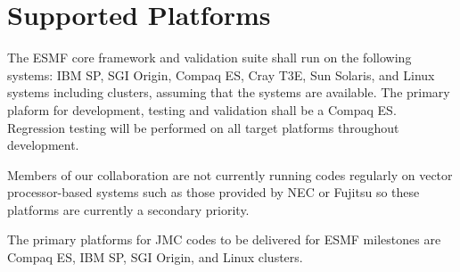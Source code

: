 
\section{Supported Platforms}
\label{sec:platforms}

The ESMF core framework and validation suite shall run on the following 
systems:  IBM SP, SGI Origin,
Compaq ES, Cray T3E, Sun Solaris, and Linux systems including clusters,
assuming that the systems are available.
The primary plaform for development, testing and validation shall be 
a Compaq ES.  Regression testing will be performed on all target 
platforms throughout development.

Members of our collaboration are not currently running codes regularly 
on vector processor-based systems such as those provided by NEC or 
Fujitsu so these platforms are currently a secondary priority.

The primary platforms for JMC codes to be delivered for ESMF
milestones are Compaq ES, IBM SP, SGI Origin, and Linux 
clusters.  











